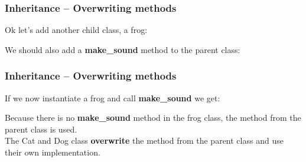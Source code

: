 \documentclass{beamer}
\begin{document}
\begin{frame}
  \frametitle{Inheritance -- Overwriting methods}
  Ok let's add another child class, a frog: 
  
  We should also add a \textbf{make\_sound} method to the parent class:
  
\end{frame}
\begin{frame}
  \frametitle{Inheritance -- Overwriting methods}
  If we now instantiate a frog and call \textbf{make\_sound} we get:
  
  \vspace{5mm}
  Because there is no \textbf{make\_sound} method in the frog class, the method from the parent class is used.\\
  \vspace{5mm}
  The Cat and Dog class \textbf{overwrite} the method from the parent class and use their own implementation.\\
\end{frame}
\end{document}
